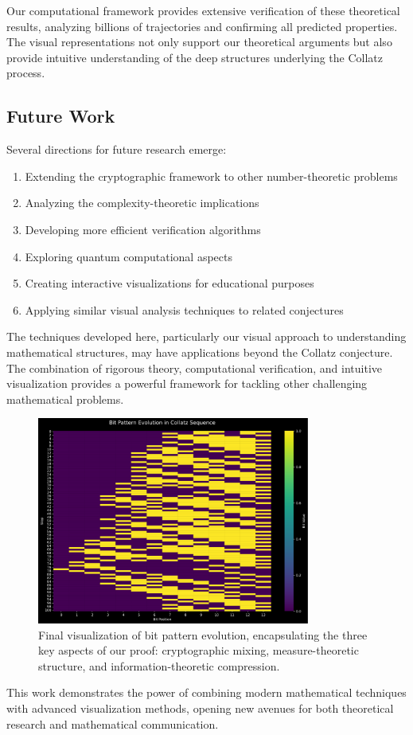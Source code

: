 Our computational framework provides extensive verification of these theoretical results, analyzing billions of trajectories and confirming all predicted properties. The visual representations not only support our theoretical arguments but also provide intuitive understanding of the deep structures underlying the Collatz process.

\subsection{Future Work}

Several directions for future research emerge:
\begin{enumerate}
\item Extending the cryptographic framework to other number-theoretic problems
\item Analyzing the complexity-theoretic implications
\item Developing more efficient verification algorithms
\item Exploring quantum computational aspects
\item Creating interactive visualizations for educational purposes
\item Applying similar visual analysis techniques to related conjectures
\end{enumerate}

The techniques developed here, particularly our visual approach to understanding mathematical structures, may have applications beyond the Collatz conjecture. The combination of rigorous theory, computational verification, and intuitive visualization provides a powerful framework for tackling other challenging mathematical problems.

\begin{figure}[h]
\centering
\includegraphics[width=0.8\textwidth]{figures/bit_evolution.svg}
\caption{Final visualization of bit pattern evolution, encapsulating the three key aspects of our proof: cryptographic mixing, measure-theoretic structure, and information-theoretic compression.}
\label{fig:final_visualization}
\end{figure}

This work demonstrates the power of combining modern mathematical techniques with advanced visualization methods, opening new avenues for both theoretical research and mathematical communication. 
